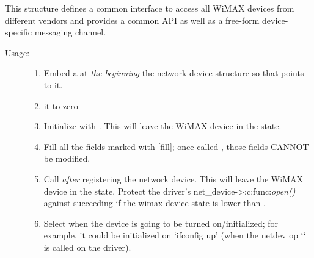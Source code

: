 \documentclass[a4paper,8pt,english]{sphinxmanual}
\begin{document}
This structure defines a common interface to access all WiMAX
devices from different vendors and provides a common API as well as
a free-form device-specific messaging channel.
\begin{description}
\item[{Usage:}] \leavevmode\begin{enumerate}
\item {} 
Embed a {\hyperref[networking/kapi:c.wimax_dev]{\emph{}}} at \emph{the beginning} the network
device structure so that {\hyperref[networking/kapi:c.netdev_priv]{\emph{}}} points to it.

\item {} 
 it to zero

\item {} 
Initialize with {\hyperref[networking/kapi:c.wimax_dev_init]{\emph{}}}. This will leave the WiMAX
device in the  state.

\item {} 
Fill all the fields marked with {[}fill{]}; once called
{\hyperref[networking/kapi:c.wimax_dev_add]{\emph{}}}, those fields CANNOT be modified.

\item {} 
Call {\hyperref[networking/kapi:c.wimax_dev_add]{\emph{}}} \emph{after} registering the network
device. This will leave the WiMAX device in the 
state.
Protect the driver's net\_device-\textgreater{}:c:func:\emph{open()} against succeeding if
the wimax device state is lower than .

\item {} 
Select when the device is going to be turned on/initialized;
for example, it could be initialized on `ifconfig up' (when the
netdev op `` is called on the driver).

\end{enumerate}

\end{description}
\end{document}
